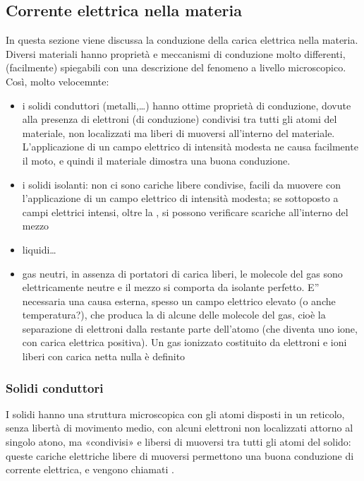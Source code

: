 \documentclass[letterpaper,10pt,italian]{jupyterBook}
\begin{document}
\subsection{Corrente elettrica nella materia}
\label{\detokenize{ch/electromagnetism/electric-current:corrente-elettrica-nella-materia}}\label{\detokenize{ch/electromagnetism/electric-current:physics-hs-electromagnetism-electric-current-media}}
\sphinxAtStartPar
In questa sezione viene discussa la conduzione della carica elettrica nella materia. Diversi materiali hanno proprietà e meccanismi di conduzione molto differenti, (facilmente) spiegabili con una descrizione del fenomeno a livello microscopico. Così, molto velocemnte:
\begin{itemize}
\item {} 
\sphinxAtStartPar
i solidi conduttori (metalli,…) hanno ottime proprietà di conduzione, dovute alla presenza di elettroni (di conduzione) condivisi tra tutti gli atomi del materiale, non localizzati ma liberi di muoversi all’interno del materiale. L’applicazione di un campo elettrico di intensità modesta ne causa facilmente il moto, e quindi il materiale dimostra una buona conduzione.

\item {} 
\sphinxAtStartPar
i solidi isolanti: non ci sono cariche libere condivise, facili da muovere con l’applicazione di un campo elettrico di intensità modesta; se sottoposto a campi elettrici intensi, oltre la , si possono verificare scariche all’interno del mezzo

\item {} 
\sphinxAtStartPar
liquidi…

\item {} 
\sphinxAtStartPar
gas neutri, in assenza di portatori di carica liberi, le molecole del gas sono elettricamente neutre e il mezzo si comporta da isolante perfetto. E” necessaria una causa esterna, spesso un campo elettrico elevato (o anche temperatura?), che produca la  di alcune delle molecole del gas, cioè la separazione di elettroni dalla restante parte dell’atomo (che diventa uno ione, con carica elettrica positiva). Un gas ionizzato costituito da elettroni e ioni liberi con carica netta nulla è definito 

\end{itemize}


\subsubsection{Solidi conduttori}
\label{\detokenize{ch/electromagnetism/electric-current:solidi-conduttori}}\label{\detokenize{ch/electromagnetism/electric-current:physics-hs-electromagnetism-electric-current-solids-conductor}}
\sphinxAtStartPar
{} I solidi hanno una struttura microscopica con gli atomi disposti in un reticolo, senza libertà di movimento medio, con alcuni elettroni non localizzati attorno al singolo atono, ma «condivisi» e libersi di muoversi tra tutti gli atomi del solido: queste cariche elettriche libere di muoversi permettono una buona conduzione di corrente elettrica, e vengono chiamati .
\end{document}

